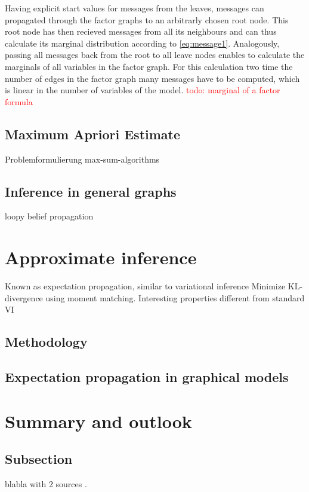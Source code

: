 \documentclass{sigkdd}
\begin{document}
Having explicit start values for messages from the leaves, messages can propagated through the factor graphs to an arbitrarly chosen root node. This root node has then recieved messages from all its neighbours and can thus calculate its marginal distribution according to \ref{eq:message1}. Analogously, passing all messages back from the root to all leave nodes enables to calculate the marginals of all variables in the factor graph. For this calculation two time the number of edges in the factor graph many messages have to be computed, which is linear in the number of variables of the model.  
\textcolor{red}{todo: marginal of a factor formula}


\subsection{Maximum Apriori Estimate}
Problemformulierung
max-sum-algorithms

\subsection{Inference in general graphs}
loopy belief propagation

\section{Approximate inference}
Known as expectation propagation, similar to variational inference
Minimize KL-divergence using moment matching.
Interesting properties different from standard VI
\subsection{Methodology}
\subsection{Expectation propagation in graphical models}

\section{Summary and outlook}


\subsection{Subsection}
blabla with 2 sources \cite{murphy2012machine, bishop2006prml}.
\end{document}
